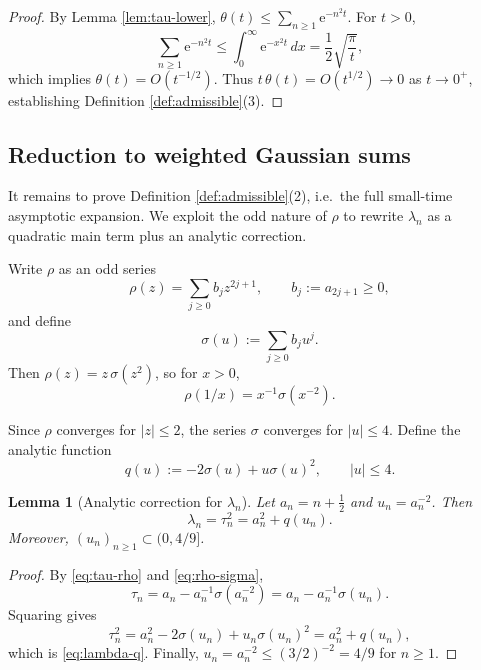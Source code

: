 \documentclass[11pt,letterpaper]{amsart}
\numberwithin{equation}{section}
\newtheorem{lemma}[theorem]{Lemma}
\theoremstyle{definition}
\newcommand{\e}{\mathrm{e}}
\begin{document}
\begin{proof}
By Lemma \ref{lem:tau-lower}, $\theta(t)\le \sum_{n\ge 1}\e^{-n^2 t}$.
For $t>0$,
\[
\sum_{n\ge 1}\e^{-n^2 t}\le \int_0^\infty \e^{-x^2 t}\,dx=\frac12\sqrt{\frac{\pi}{t}},
\]
which implies $\theta(t)=O(t^{-1/2})$.
Thus $t\,\theta(t)=O(t^{1/2})\to 0$ as $t\to 0^+$, establishing Definition \ref{def:admissible}(3).
\end{proof}


\subsection{Reduction to weighted Gaussian sums}\label{sec:reduction}

It remains to prove Definition \ref{def:admissible}(2), i.e.\ the full small-time asymptotic expansion. We exploit the odd nature of $\rho$ to rewrite $\lambda_n$ as a quadratic main term plus an analytic correction.

Write $\rho$ as an odd series
\[
\rho(z)=\sum_{j\ge 0} b_j z^{2j+1},\qquad b_j:=a_{2j+1}\ge 0,
\]
and define
\[
\sigma(u):=\sum_{j\ge 0} b_j u^j.
\]
Then $\rho(z)=z\,\sigma(z^2)$, so for $x>0$,
\begin{equation}\label{eq:rho-sigma}
\rho(1/x)=x^{-1}\sigma(x^{-2}).
\end{equation}

Since $\rho$ converges for $|z|\le 2$, the series $\sigma$ converges for $|u|\le 4$.
Define the analytic function
\begin{equation}\label{eq:def-q}
q(u):=-2\sigma(u)+u\sigma(u)^2,\qquad |u|\le 4.
\end{equation}

\begin{lemma}[Analytic correction for $\lambda_n$]\label{lem:lambda-q}
Let $a_n=n+\tfrac12$ and $u_n=a_n^{-2}$. Then
\begin{equation}\label{eq:lambda-q}
\lambda_n=\tau_n^2=a_n^2 + q(u_n).
\end{equation}
Moreover, $(u_n)_{n\ge 1}\subset (0,4/9]$.
\end{lemma}

\begin{proof}
By \eqref{eq:tau-rho} and \eqref{eq:rho-sigma},
\[
\tau_n=a_n-a_n^{-1}\sigma(a_n^{-2}) = a_n-a_n^{-1}\sigma(u_n).
\]
Squaring gives
\[
\tau_n^2 = a_n^2 -2\sigma(u_n)+u_n\sigma(u_n)^2 = a_n^2 + q(u_n),
\]
which is \eqref{eq:lambda-q}.
Finally, $u_n=a_n^{-2}\le (3/2)^{-2}=4/9$ for $n\ge 1$.
\end{proof}
\end{document}
